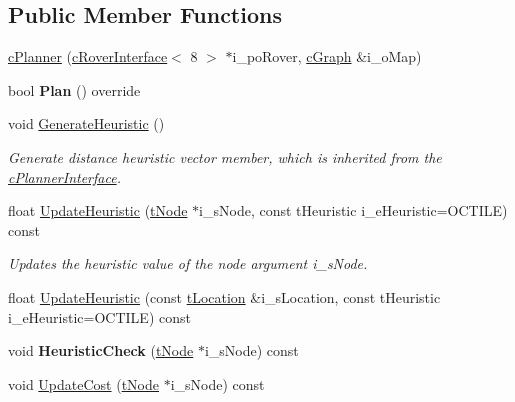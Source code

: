 \subsection*{Public Member Functions}
\begin{DoxyCompactItemize}
\item 
\mbox{\hyperlink{classplanner_1_1c_planner_a4f425d47b277f000d34df04de9995274}{c\+Planner}} (\mbox{\hyperlink{classplanner_1_1c_rover_interface}{c\+Rover\+Interface}}$<$ 8 $>$ $\ast$i\+\_\+po\+Rover, \mbox{\hyperlink{classplanner_1_1c_graph}{c\+Graph}} \&i\+\_\+o\+Map)
\item 
\mbox{\label{classplanner_1_1c_planner_afa7212b235c56144cad344e08c3142d7}} 
bool {\bfseries Plan} () override
\item 
void \mbox{\hyperlink{classplanner_1_1c_planner_a1a4650050656545744796296a653d388}{Generate\+Heuristic}} ()
\begin{DoxyCompactList}\small\item\em Generate distance heuristic vector member, which is inherited from the \mbox{\hyperlink{classplanner_1_1c_planner_interface}{c\+Planner\+Interface}}. \end{DoxyCompactList}\item 
float \mbox{\hyperlink{classplanner_1_1c_planner_ad32a7c58b885456ced172b66fed854f0}{Update\+Heuristic}} (\mbox{\hyperlink{structplanner_1_1t_node}{t\+Node}} $\ast$i\+\_\+s\+Node, const t\+Heuristic i\+\_\+e\+Heuristic=O\+C\+T\+I\+LE) const
\begin{DoxyCompactList}\small\item\em Updates the heuristic value of the node argument i\+\_\+s\+Node. \end{DoxyCompactList}\item 
float \mbox{\hyperlink{classplanner_1_1c_planner_a7d5f7f89a10b66f19c0257cbf7f2afbb}{Update\+Heuristic}} (const \mbox{\hyperlink{structplanner_1_1t_location}{t\+Location}} \&i\+\_\+s\+Location, const t\+Heuristic i\+\_\+e\+Heuristic=O\+C\+T\+I\+LE) const
\item 
\mbox{\label{classplanner_1_1c_planner_a8b4f67bd192db4784c6ab95c11e51a16}} 
void {\bfseries Heuristic\+Check} (\mbox{\hyperlink{structplanner_1_1t_node}{t\+Node}} $\ast$i\+\_\+s\+Node) const
\item 
void \mbox{\hyperlink{classplanner_1_1c_planner_a82e45fc2701e90d3fa9df72f475e455e}{Update\+Cost}} (\mbox{\hyperlink{structplanner_1_1t_node}{t\+Node}} $\ast$i\+\_\+s\+Node) const

\end{DoxyCompactItemize}
